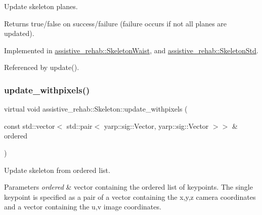 Update skeleton planes. 

\begin{DoxyReturn}{Returns}
true/false on success/failure (failure occurs if not all planes are updated). 
\end{DoxyReturn}


Implemented in \mbox{\hyperlink{classassistive__rehab_1_1SkeletonWaist_aee15b1accdf628b18dac2a372597644a}{assistive\+\_\+rehab\+::\+Skeleton\+Waist}}, and \mbox{\hyperlink{classassistive__rehab_1_1SkeletonStd_a5769bc6fd407118c866b57b869d672ca}{assistive\+\_\+rehab\+::\+Skeleton\+Std}}.



Referenced by update().

\mbox{\label{classassistive__rehab_1_1Skeleton_a20d9eb5aecd6dccfa7e049bb932a6cef}} 
\subsubsection{\texorpdfstring{update\_withpixels()}{update\_withpixels()}\hspace{0.1cm}{\footnotesize\ttfamily [1/2]}}
{\footnotesize\ttfamily virtual void assistive\+\_\+rehab\+::\+Skeleton\+::update\+\_\+withpixels (\begin{DoxyParamCaption}\item[{const std\+::vector$<$ std\+::pair$<$ yarp\+::sig\+::\+Vector, yarp\+::sig\+::\+Vector $>$$>$ \&}]{ordered }\end{DoxyParamCaption})\hspace{0.3cm}{\ttfamily [virtual]}}



Update skeleton from ordered list. 


\begin{DoxyParams}{Parameters}
{\em ordered} & vector containing the ordered list of keypoints. The single keypoint is specified as a pair of a vector containing the x,y,z camera coordinates and a vector containing the u,v image coordinates. \\
\hline
\end{DoxyParams}
\mbox{\label{classassistive__rehab_1_1Skeleton_a36e9dfd4910120025e40ccc3d03c0e01}} 
